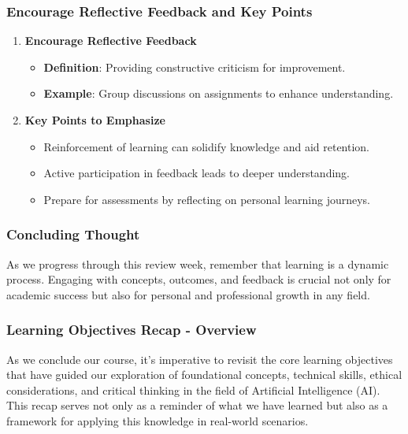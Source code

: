 \documentclass[aspectratio=169]{beamer}
\begin{document}
\begin{frame}[fragile]
    \frametitle{Encourage Reflective Feedback and Key Points}
    \begin{enumerate}
        \item \textbf{Encourage Reflective Feedback}
        \begin{itemize}
            \item \textbf{Definition}: Providing constructive criticism for improvement.
            \item \textbf{Example}: Group discussions on assignments to enhance understanding.
        \end{itemize}

        \item \textbf{Key Points to Emphasize}
        \begin{itemize}
            \item Reinforcement of learning can solidify knowledge and aid retention.
            \item Active participation in feedback leads to deeper understanding.
            \item Prepare for assessments by reflecting on personal learning journeys.
        \end{itemize}
    \end{enumerate}
\end{frame}

\begin{frame}[fragile]
    \frametitle{Concluding Thought}
    As we progress through this review week, remember that learning is a dynamic process. Engaging with concepts, outcomes, and feedback is crucial not only for academic success but also for personal and professional growth in any field.
\end{frame}

\begin{frame}[fragile]
    \frametitle{Learning Objectives Recap - Overview}
    As we conclude our course, it's imperative to revisit the core learning objectives that have guided our exploration of foundational concepts, technical skills, ethical considerations, and critical thinking in the field of Artificial Intelligence (AI). 
    This recap serves not only as a reminder of what we have learned but also as a framework for applying this knowledge in real-world scenarios.
\end{frame}
\end{document}
